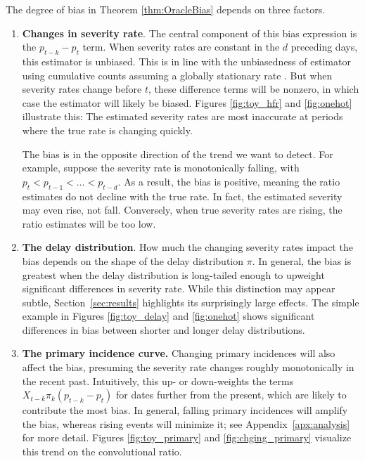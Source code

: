 \documentclass{article}
\begin{document}
The degree of bias in Theorem \ref{thm:OracleBias} depends on three factors.
\begin{enumerate}
    \item \textbf{Changes in severity rate}. The central component of this bias expression is the $p_{t-k}-p_t$ term. When severity rates are constant in the $d$ preceding days, this estimator is unbiased. This is in line with the unbiasedness of estimator using cumulative counts assuming a globally stationary rate \citep{nishiura}. But when severity rates change before $t$, these difference terms will be nonzero, in which case the estimator will likely be biased. 
Figures \ref{fig:toy_hfr} and \ref{fig:onehot} illustrate this: The estimated severity rates are most inaccurate at periods where the true rate is changing quickly. 

The bias is in the opposite direction of the trend we want to detect. For example, suppose the severity rate is monotonically falling, with $p_{t} < p_{t-1} < \ldots < p_{t-d}$.%
As a result, the bias is positive, meaning the ratio estimates do not decline with the true rate. In fact, the estimated severity may even rise, not fall. Conversely, when true severity rates are rising, the ratio estimates will be too low. %

    \item \textbf{The delay distribution}. How much the changing severity rates impact the bias depends on the shape of the delay distribution $\pi$. In general, the bias is greatest when the delay distribution is long-tailed enough to upweight significant differences in severity rate. While this distinction may appear subtle, Section~\ref{sec:results} highlights its surprisingly large effects. The simple example in Figures \ref{fig:toy_delay} and \ref{fig:onehot} shows significant differences in bias between shorter and longer delay distributions. 
\item \textbf{The primary incidence curve.} Changing primary incidences will also affect the bias, presuming the severity rate changes roughly monotonically in the recent past. Intuitively, this up- or down-weights the terms $X_{t-k}\pi_k(p_{t-k} - p_t)$ for dates further from the present, which are likely to contribute the most bias. In general, falling primary incidences will amplify the bias, whereas rising events will minimize it; see Appendix~\ref{apx:analysis} for more detail. Figures \ref{fig:toy_primary} and \ref{fig:chging_primary} visualize this trend on the convolutional ratio. 

\end{enumerate}
\end{document}
